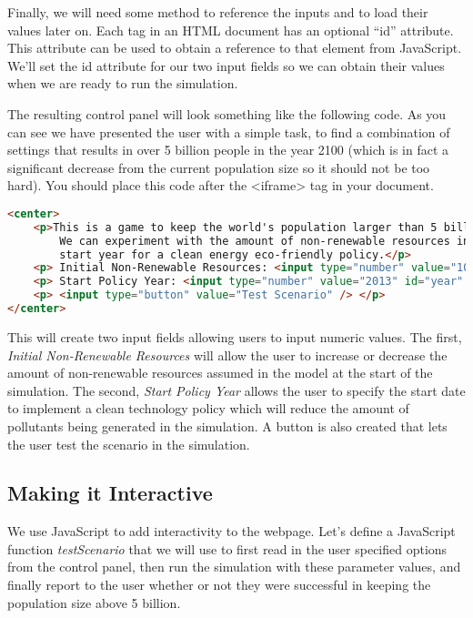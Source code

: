 \documentclass[]{memoir}
\begin{document}
Finally, we will need some method to reference the inputs and to load
their values later on. Each tag in an HTML document has an optional
``id'' attribute. This attribute can be used to obtain a reference to
that element from JavaScript. We'll set the id attribute for our two
input fields so we can obtain their values when we are ready to run the
simulation.

The resulting control panel will look something like the following code.
As you can see we have presented the user with a simple task, to find a
combination of settings that results in over 5 billion people in the
year 2100 (which is in fact a significant decrease from the current
population size so it should not be too hard). You should place this
code after the \textless{}iframe\textgreater{} tag in your document.

\begin{lstlisting}[language=HTML]
<center>
    <p>This is a game to keep the world's population larger than 5 billion in the year 2100.
        We can experiment with the amount of non-renewable resources in the world and the
        start year for a clean energy eco-friendly policy.</p>
    <p> Initial Non-Renewable Resources: <input type="number" value="100" id="resources" /> % </p>
    <p> Start Policy Year: <input type="number" value="2013" id="year" /> </p>
    <p> <input type="button" value="Test Scenario" /> </p>
</center>
\end{lstlisting}

This will create two input fields allowing users to input numeric
values. The first, \emph{Initial Non-Renewable Resources} will allow the
user to increase or decrease the amount of non-renewable resources
assumed in the model at the start of the simulation. The second,
\emph{Start Policy Year} allows the user to specify the start date to
implement a clean technology policy which will reduce the amount of
pollutants being generated in the simulation. A button is also created
that lets the user test the scenario in the simulation.

\subsection{Making it Interactive}

We use JavaScript to add interactivity to the webpage. Let's define a
JavaScript function \emph{testScenario} that we will use to first read
in the user specified options from the control panel, then run the
simulation with these parameter values, and finally report to the user
whether or not they were successful in keeping the population size above
5 billion.
\end{document}
